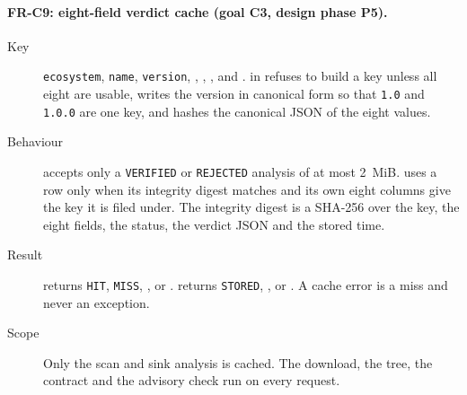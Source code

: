 \paragraph{FR-C9: eight-field verdict cache (goal C3, design phase P5).}
\begin{sloppypar}
\begin{description}
    \item[Key] \texttt{ecosystem}, \texttt{name}, \texttt{version}, , , ,  and .  in  refuses to build a key unless all eight are usable, writes the version in canonical form so that \texttt{1.0} and \texttt{1.0.0} are one key, and hashes the canonical JSON of the eight values.
    \item[Behaviour]  accepts only a \texttt{VERIFIED} or \texttt{REJECTED} analysis of at most 2~MiB.  uses a row only when its integrity digest matches and its own eight columns give the key it is filed under. The integrity digest is a SHA-256 over the key, the eight fields, the status, the verdict JSON and the stored time.
    \item[Result]  returns \texttt{HIT}, \texttt{MISS}, ,  or .  returns \texttt{STORED}, ,  or . A cache error is a miss and never an exception.
    \item[Scope] Only the scan and sink analysis is cached. The download, the tree, the contract and the advisory check run on every request.
\end{description}
\end{sloppypar}


